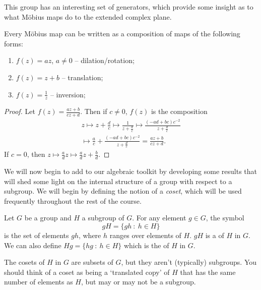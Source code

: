 This group has an interesting set of generators, which provide some insight as to what Möbius maps do to the extended complex plane.

\begin{theorem}
	Every Möbius map can be written as a composition of maps of the following forms:
	\begin{enumerate}
		\item $f(z) = az$, $a \neq 0$ -- dilation/rotation;
		\item $f(z) = z + b$ -- translation;
		\item $f(z) = \frac{1}{z}$ -- inversion;
	\end{enumerate}
\end{theorem}
\begin{proof}
	Let $f(z) = \frac{az + b}{cz + d}$. Then if $c \neq 0$, $f(z)$ is the composition
	\begin{align*}
		z \longmapsto z + \frac{d}{c} \longmapsto \frac{1}{z + \frac{d}{c}} \longmapsto \frac{(-ad + bc)c^{-2}}{z + \frac{d}{c}} \\
		\longmapsto \frac{a}{c} + \frac{(-ad + bc)c^{-2}}{z + \frac{d}{c}} = \frac{az + b}{cz + d}.
	\end{align*}
	If $c = 0$, then $z \mapsto \frac{a}{d}z \mapsto \frac{a}{d}z + \frac{b}{d}$. 
\end{proof}


We will now begin to add to our algebraic toolkit by developing some results that will shed some light on the internal structure of a group with respect to a subgroup. We will begin by defining the notion of a \emph{coset}, which will be used frequently throughout the rest of the course.

\begin{definition}[Coset]
	Let $G$ be a group and $H$ a subgroup of $G$. For any element $g \in G$, the symbol
	$$
	gH = \{gh \ : \ h \in H\}
	$$
	is the set of elements $gh$, where $h$ ranges over elements of $H$. $gH$ is a  of $H$ in $G$. We can also define $Hg = \{hg \ :\ h \in H\}$ which is the  of $H$ in $G$.
\end{definition}

The cosets of $H$ in $G$ are subsets of $G$, but they aren't (typically) subgroups. You should think of a coset as being a `translated copy' of $H$ that has the same number of elements as $H$, but may or may not be a subgroup.

